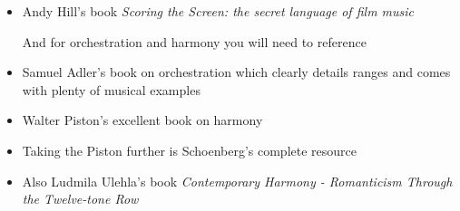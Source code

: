 \begin{itemize}
\item Andy Hill's book \textit{Scoring the Screen: the secret language of film music}  \citep{hill2017scoring}

And for orchestration and harmony you will need to reference

\item Samuel Adler's book on orchestration which clearly details ranges and comes with plenty of musical examples \citep{adler1989study} 
\item Walter Piston's excellent book on harmony \citep{piston1978harmony}
\item Taking the Piston further is Schoenberg's complete resource \citep{schoenberg1978theory}
\item Also Ludmila Ulehla's book \textit{Contemporary Harmony - Romanticism Through the Twelve-tone Row} \citep{ulehla1966contemporary}
\end{itemize}
